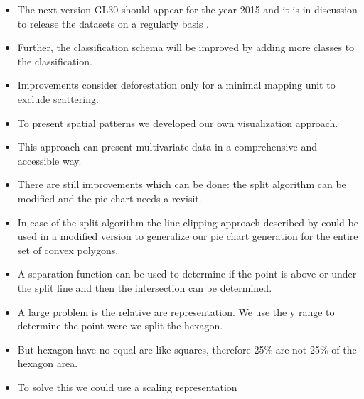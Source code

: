 \begin{itemize}
				\item The next version \ac{GL30} should appear for the year 2015 and it is in discussion to release the datasets on a regularly basis \citep{Chen2017}.
				\item Further, the classification schema will be improved by adding more classes to the classification.
				\item Improvements consider deforestation only for a minimal mapping unit to exclude scattering.
				\item To present spatial patterns we developed our own visualization approach.
				\item This approach can present multivariate data in a comprehensive and accessible way.
				\item There are still improvements which can be done: the split algorithm can be modified and the pie chart needs a revisit.
				\item In case of the split algorithm the line clipping approach described by \citep{Skala1994} could be used in a modified version to generalize our pie chart generation for the entire set of convex polygons.
				\item A separation function can be used to determine if the point is above or under the split line and then the intersection can be determined.
				\item A large problem is the relative are representation. We use the y range to determine the point were we split the hexagon.
				\item But hexagon have no equal are like squares, therefore 25\% are not 25\% of the hexagon area.
				\item To solve this we could use a scaling representation
			\end{itemize}

